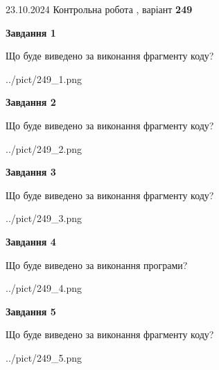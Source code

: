 \documentclass[12pt, ukrainian]{article}
\begin{document}
{\Large{23.10.2024 Контрольна робота , варіант  \No \textbf { 249 }\par}}
{
\begin {large}
{\begin {center}\textbf{Завдання 1}\end {center}}

Що буде виведено за виконання фрагменту коду?\par
\begin{center}
	{../pict/249_1.png}
\end{center}
\newpage

{\begin {center}\textbf{Завдання 2}\end {center}}

Що буде виведено за виконання фрагменту коду?\par
\begin{center}
	{../pict/249_2.png}
\end{center}
\newpage

{\begin {center}\textbf{Завдання 3}\end {center}}

Що буде виведено за виконання фрагменту коду?\par
\begin{center}
	{../pict/249_3.png}
\end{center}
\newpage

{\begin {center}\textbf{Завдання 4}\end {center}}

Що буде виведено за виконання програми?\par
\begin{center}
	{../pict/249_4.png}
\end{center}
\newpage

{\begin {center}\textbf{Завдання 5}\end {center}}

Що буде виведено за виконання фрагменту коду?\par
\begin{center}
	{../pict/249_5.png}
\end{center}
\newpage


\end{large}}
\end{document}

